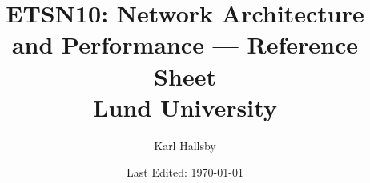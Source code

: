 




\DeclareMathOperator{\Prob}{\operatorname{P}}
\DeclareMathOperator{\Given}{\vert}
\DeclareMathOperator{\ExpectedValue}{\operatorname{\mathbb{E}}}
\DeclareMathOperator{\Variance}{\operatorname{VAR}}
\DeclareMathOperator{\StdDev}{\operatorname{STD}}
\DeclareMathOperator{\Covariance}{\operatorname{Cov}}
\DeclareMathOperator{\CorrCoeff}{\rho}

\newcommand{\SetOrder}[1]{\lvert #1 \rvert}

\begin{titlepage}
  \title{ETSN10: Network Architecture and Performance --- Reference Sheet \\ Lund University}
  \author{Karl Hallsby}
  \date{Last Edited: \today} %
\end{titlepage}


\maketitle
{} %
\tableofcontents
\clearpage
\listoftheorems[ignoreall, show={definition, Definition}]
\clearpage
{} %







